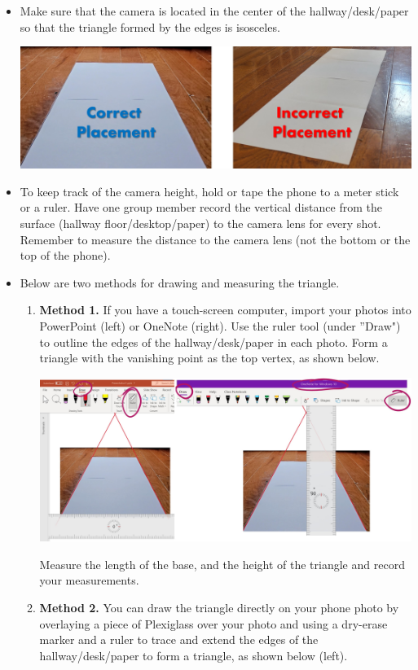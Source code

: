 \documentclass{ximera}
\begin{document}
\begin{itemize}
    \item Make sure that the camera is located in the center of the hallway/desk/paper so that the triangle formed by the edges is isosceles.
    \begin{image}
         \includegraphics[width=5in]{paperPlacement.jpg}
\end{image}
\item To keep track of the camera height, hold or tape the phone to a meter stick or a ruler. Have one group member record the vertical distance from the surface (hallway floor/desktop/paper) to the camera lens for every shot.  Remember to measure the distance to the camera lens (not the bottom or the top of the phone).
\item Below are two methods for drawing and measuring the triangle.
\begin{enumerate}
    \item \textbf{Method 1.} If you have a touch-screen computer, import your photos into PowerPoint (left) or OneNote (right).  Use the ruler tool (under ''Draw") to outline the edges of the hallway/desk/paper in each photo. Form a triangle with the vanishing point as the top vertex, as shown below.

    \begin{image}
         \includegraphics[width=5in]{rulerUse.jpg}
\end{image}

Measure the length of the base, and the height of the triangle and record your measurements.
\item \textbf{Method 2.} You can draw the triangle directly on your phone photo by overlaying a piece of Plexiglass over your photo and using a dry-erase marker and a ruler to trace and extend the edges of the hallway/desk/paper to form a triangle, as shown below (left).


\end{enumerate}
\end{itemize}
\end{document}
